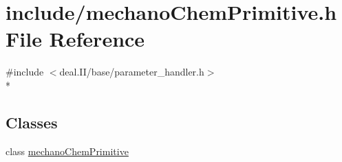 \section{include/mechano\-Chem\-Primitive.h File Reference}
\label{mechano_chem_primitive_8h}
{\ttfamily \#include $<$deal.\-I\-I/base/parameter\-\_\-handler.\-h$>$}\\*
\subsection*{Classes}
\begin{DoxyCompactItemize}
\item 
class \hyperlink{classmechano_chem_primitive}{mechano\-Chem\-Primitive}
\end{DoxyCompactItemize}
